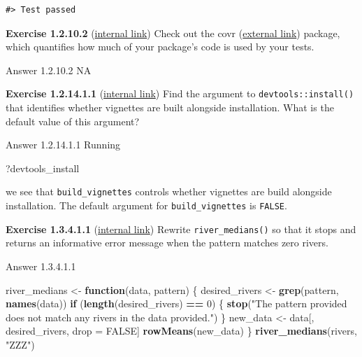 \documentclass[
]{book}
\newenvironment{Shaded}{\begin{snugshade}}{\end{snugshade}}
\newcommand{\ControlFlowTok}[1]{\textcolor[rgb]{0.13,0.29,0.53}{\textbf{#1}}}
\newcommand{\DecValTok}[1]{\textcolor[rgb]{0.00,0.00,0.81}{#1}}
\newcommand{\KeywordTok}[1]{\textcolor[rgb]{0.13,0.29,0.53}{\textbf{#1}}}
\newcommand{\NormalTok}[1]{#1}
\newcommand{\OperatorTok}[1]{\textcolor[rgb]{0.81,0.36,0.00}{\textbf{#1}}}
\newcommand{\OtherTok}[1]{\textcolor[rgb]{0.56,0.35,0.01}{#1}}
\newcommand{\StringTok}[1]{\textcolor[rgb]{0.31,0.60,0.02}{#1}}
\begin{document}
\begin{verbatim}
#> Test passed
\end{verbatim}

\textbf{Exercise 1.2.10.2} (\protect\hyperlink{ex-set4}{internal link})
Check out the covr (\href{https://cran.r-project.org/web/packages/covr/vignettes/how_it_works.html}{external link}) package, which quantifies how much of your package's code is used by your tests.

Answer 1.2.10.2
NA

\textbf{Exercise 1.2.14.1.1} (\protect\hyperlink{ex-set5}{internal link})
Find the argument to \texttt{devtools::install()} that identifies whether vignettes are built alongside installation. What is the default value of this argument?

Answer 1.2.14.1.1
Running

\begin{Shaded}
\begin{Highlighting}[]
\NormalTok{?devtools_install}
\end{Highlighting}
\end{Shaded}

we see that \texttt{build\_vignettes} controls whether vignettes are build alongside installation. The default argument for \texttt{build\_vignettes} is \texttt{FALSE}.

\textbf{Exercise 1.3.4.1.1} (\protect\hyperlink{ex-set6}{internal link})
Rewrite \texttt{river\_medians()} so that it stops and returns an informative error message when the pattern matches zero rivers.

Answer 1.3.4.1.1

\begin{Shaded}
\begin{Highlighting}[]
\NormalTok{river_medians <-}\StringTok{ }\ControlFlowTok{function}\NormalTok{(data, pattern) \{}
\NormalTok{  desired_rivers <-}\StringTok{ }\KeywordTok{grep}\NormalTok{(pattern, }\KeywordTok{names}\NormalTok{(data))}
  \ControlFlowTok{if}\NormalTok{ (}\KeywordTok{length}\NormalTok{(desired_rivers) }\OperatorTok{==}\StringTok{ }\DecValTok{0}\NormalTok{) \{}
    \KeywordTok{stop}\NormalTok{(}\StringTok{"The pattern provided does not match any rivers in the data provided."}\NormalTok{)}
\NormalTok{  \}}
\NormalTok{  new_data <-}\StringTok{ }\NormalTok{data[, desired_rivers, drop =}\StringTok{ }\OtherTok{FALSE}\NormalTok{]}
  \KeywordTok{rowMeans}\NormalTok{(new_data)}
\NormalTok{\}}
\KeywordTok{river_medians}\NormalTok{(rivers, }\StringTok{"ZZZ"}\NormalTok{)}
\end{Highlighting}
\end{Shaded}
\end{document}
